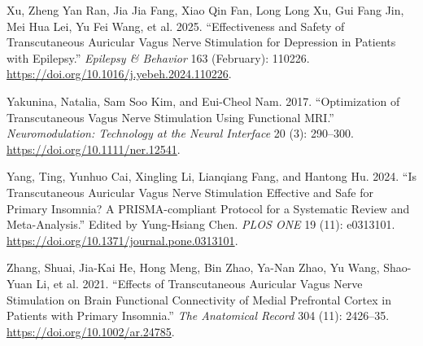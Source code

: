 \documentclass[
  Letterpaper,
]{scrbook}
\newlength{\cslhangindent}
\newenvironment{CSLReferences}[2] %
 {\begin{list}{}{%
  \setlength{\itemindent}{0pt}
  \setlength{\leftmargin}{0pt}
  \setlength{\parsep}{0pt}
  \ifodd #1
   \setlength{\leftmargin}{\cslhangindent}
   \setlength{\itemindent}{-1\cslhangindent}
  \fi
  \setlength{\itemsep}{#2\baselineskip}}}
 {\end{list}}
\begin{document}
\begin{CSLReferences}{1}{0}
Xu, Zheng Yan Ran, Jia Jia Fang, Xiao Qin Fan, Long Long Xu, Gui Fang
Jin, Mei Hua Lei, Yu Fei Wang, et al. 2025. {``Effectiveness and Safety
of Transcutaneous Auricular Vagus Nerve Stimulation for Depression in
Patients with Epilepsy.''} \emph{Epilepsy \& Behavior} 163 (February):
110226. \url{https://doi.org/10.1016/j.yebeh.2024.110226}.

Yakunina, Natalia, Sam Soo Kim, and Eui-Cheol Nam. 2017. {``Optimization
of {Transcutaneous Vagus Nerve Stimulation Using Functional MRI}.''}
\emph{Neuromodulation: Technology at the Neural Interface} 20 (3):
290--300. \url{https://doi.org/10.1111/ner.12541}.

Yang, Ting, Yunhuo Cai, Xingling Li, Lianqiang Fang, and Hantong Hu.
2024. {``Is Transcutaneous Auricular Vagus Nerve Stimulation Effective
and Safe for Primary Insomnia? {A PRISMA-compliant} Protocol for a
Systematic Review and Meta-Analysis.''} Edited by Yung-Hsiang Chen.
\emph{PLOS ONE} 19 (11): e0313101.
\url{https://doi.org/10.1371/journal.pone.0313101}.

Zhang, Shuai, Jia-Kai He, Hong Meng, Bin Zhao, Ya-Nan Zhao, Yu Wang,
Shao-Yuan Li, et al. 2021. {``Effects of Transcutaneous Auricular Vagus
Nerve Stimulation on Brain Functional Connectivity of Medial Prefrontal
Cortex in Patients with Primary Insomnia.''} \emph{The Anatomical
Record} 304 (11): 2426--35. \url{https://doi.org/10.1002/ar.24785}.

\end{CSLReferences}


\backmatter

\printindex
\end{document}
